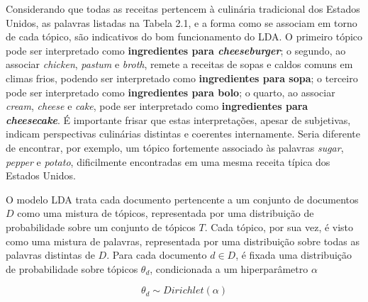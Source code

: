 Considerando que todas as receitas pertencem à culinária tradicional dos Estados Unidos, as palavras listadas na Tabela 2.1, e a forma como se associam em torno de cada tópico, são indicativos do bom funcionamento do LDA. O primeiro tópico pode ser interpretado como \textbf{ingredientes para          \emph{cheeseburger}}; o segundo, ao associar \emph{chicken}, \emph{pastum} e \emph{broth}, remete a receitas de sopas e caldos comuns em climas frios, podendo ser interpretado como \textbf{ingredientes para sopa}; o terceiro pode ser interpretado como \textbf{ingredientes para bolo}; o quarto, ao associar \emph{cream}, \emph{cheese} e \emph{cake}, pode ser interpretado como \textbf{ingredientes para \emph{cheesecake}}. É importante frisar que estas interpretações, apesar de subjetivas, indicam perspectivas culinárias distintas e coerentes internamente. Seria diferente de encontrar, por exemplo, um tópico fortemente associado às palavras \emph{sugar}, \emph{pepper} e \emph{potato}, dificilmente encontradas em uma mesma receita típica dos Estados Unidos.






O modelo LDA trata cada documento pertencente a um conjunto de documentos \ensuremath{D} como uma mistura de tópicos, representada por uma distribuição de probabilidade sobre um conjunto de tópicos \ensuremath{T}. Cada tópico, por sua vez, é visto como uma mistura de palavras, representada por uma distribuição sobre todas as palavras distintas de \ensuremath{D}. Para cada documento \ensuremath{d \in D}, é fixada uma distribuição de probabilidade sobre tópicos \ensuremath{\theta_d}, condicionada a um hiperparâmetro \ensuremath{\alpha}

\begin{equation}
\label{lda:topic}
\ensuremath{\theta_d \sim Dirichlet(\alpha)}
\end{equation}

